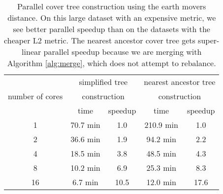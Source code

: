 \documentclass[thesis.tex]{subfiles}
\begin{document}
\begin{table}
\centering
\begin{tabular}{ccccc}
\multirow{3}{*}{\parbox{1cm}{\centering number of cores}}
 & \multicolumn{2}{c}{simplified tree} & \multicolumn{2}{c}{nearest ancestor tree} \\
& \multicolumn{2}{c}{construction} & \multicolumn{2}{c}{construction} \\ %
& time & speedup & time & speedup \\
\hline
1  & 70.7 min & 1.0 & 210.9 min& 1.0\\
2  & 36.6 min & 1.9 & 94.2 min & 2.2\\
4  & 18.5 min & 3.8 & 48.5 min & 4.3\\
8  & 10.2 min & 6.9 & 25.3 min & 8.3\\
16 & 6.7 min & 10.5 & 12.0 min & 17.6\\
\end{tabular}
\caption{
    Parallel cover tree construction using the earth movers distance.
    On this large dataset with an expensive metric, we see better parallel speedup than on the datasets with the cheaper L2 metric.
The nearest ancestor cover tree gets super-linear parallel speedup because we are merging with Algorithm \ref{alg:merge}, which does not attempt to rebalance.
}
\label{tab:emd}
\end{table}


\end{document}
